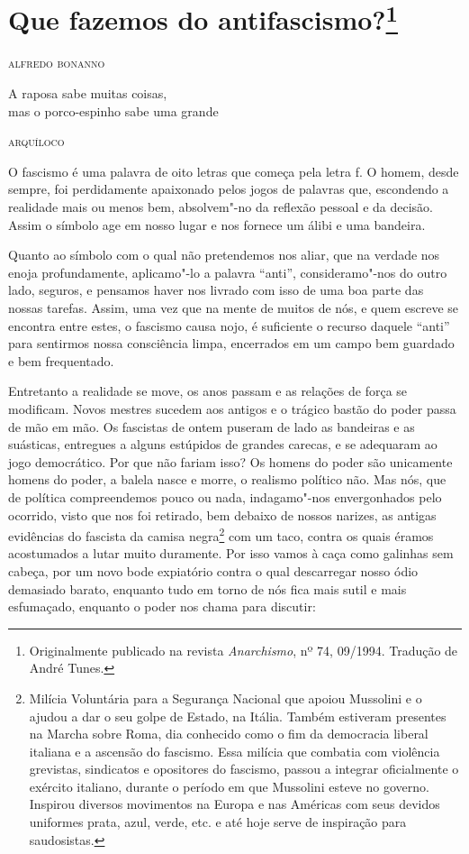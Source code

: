 \chapter{Que fazemos do antifascismo?\footnote[*]{Originalmente publicado na revista \emph{Anarchismo}, nº 74, 09/1994. Tradução de André Tunes.}}

\hfill{}\textsc{alfredo bonanno}

\bigskip

\epigraph{A raposa sabe muitas coisas,\\ mas o porco-espinho sabe uma grande}{\textsc{arquíloco}}


O fascismo é uma palavra de oito letras que começa pela letra f. O
homem, desde sempre, foi perdidamente apaixonado pelos jogos de palavras
que, escondendo a realidade mais ou menos bem, absolvem"-no da reflexão
pessoal e da decisão. Assim o símbolo age em nosso lugar e nos fornece
um álibi e uma bandeira.

Quanto ao símbolo com o qual não pretendemos nos aliar, que na verdade
nos enoja profundamente, aplicamo"-lo a palavra ``anti'', consideramo"-nos
do outro lado, seguros, e pensamos haver nos livrado com isso de uma boa
parte das nossas tarefas. Assim, uma vez que na mente de muitos de nós,
e quem escreve se encontra entre estes, o fascismo causa nojo, é
suficiente o recurso daquele ``anti'' para sentirmos nossa consciência
limpa, encerrados em um campo bem guardado e bem frequentado.

Entretanto a realidade se move, os anos passam e as relações de força se
modificam. Novos mestres sucedem aos antigos e o trágico bastão do poder
passa de mão em mão. Os fascistas de ontem puseram de lado as bandeiras
e as suásticas, entregues a alguns estúpidos de grandes carecas, e se
adequaram ao jogo democrático. Por que não fariam isso? Os homens do
poder são unicamente homens do poder, a balela nasce e morre, o realismo
político não. Mas nós, que de política compreendemos pouco ou nada,
indagamo"-nos envergonhados pelo ocorrido, visto que nos foi retirado,
bem debaixo de nossos narizes, as antigas evidências do fascista da
camisa negra\footnote{Milícia Voluntária para a Segurança Nacional que apoiou Mussolini e o
  ajudou a dar o seu golpe de Estado, na Itália. Também estiveram
  presentes na Marcha sobre Roma, dia conhecido como o fim da democracia
  liberal italiana e a ascensão do fascismo. Essa milícia que combatia
  com violência grevistas, sindicatos e opositores do fascismo, passou a
  integrar oficialmente o exército italiano, durante o período em que
  Mussolini esteve no governo. Inspirou diversos movimentos na Europa e
  nas Américas com seus devidos uniformes prata, azul, verde, etc. e até
  hoje serve de inspiração para saudosistas.} com um taco, contra os quais éramos acostumados a lutar
muito duramente. Por isso vamos à caça como galinhas sem cabeça, por um
novo bode expiatório contra o qual descarregar nosso ódio demasiado
barato, enquanto tudo em torno de nós fica mais sutil e mais esfumaçado,
enquanto o poder nos chama para discutir:

